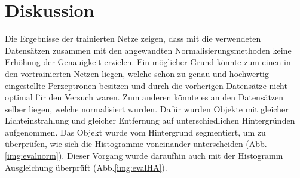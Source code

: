 \documentclass[a4paper,12pt,oneside]{article}
\begin{document}
  \section{Diskussion}
Die Ergebnisse der trainierten Netze zeigen, dass mit die verwendeten Datensätzen zusammen mit den angewandten Normalisierungsmethoden keine Erhöhung der Genauigkeit erzielen. Ein möglicher Grund könnte zum einen in den vortrainierten Netzen liegen, welche schon zu genau und hochwertig eingestellte Perzeptronen besitzen und durch die vorherigen Datensätze nicht optimal für den Versuch waren. Zum anderen könnte es an den Datensätzen selber liegen, welche normalisiert wurden. Dafür wurden Objekte mit gleicher Lichteinstrahlung und gleicher Entfernung auf unterschiedlichen Hintergründen aufgenommen. Das Objekt wurde vom Hintergrund segmentiert, um zu überprüfen, wie sich die Histogramme voneinander unterscheiden (Abb.\ref{img:evalnorm}). Dieser Vorgang wurde daraufhin auch mit der Histogramm Ausgleichung überprüft (Abb.\ref{img:evalHA}).\\
\end{document}
